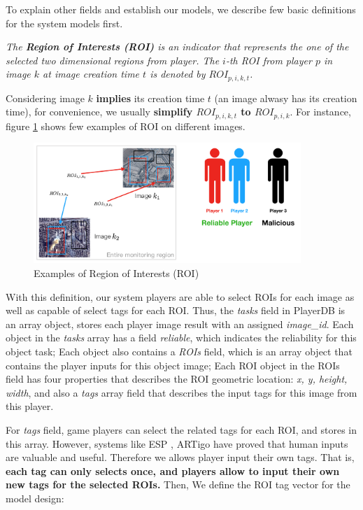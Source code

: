 To explain other fields and establish our models, we describe few basic definitions for the system models first.

\begin{definition}
\label{def:roi}
\emph{The \textbf{Region of Interests (ROI)} is an indicator that represents the one of the selected two dimensional regions from player. 
The $i$-th ROI from player $p$ in image $k$ at image creation time $t$ is denoted by $ROI_{p,i,k,t}$.}
\end{definition}

Considering image $k$ \textbf{implies} its creation time $t$ (an image alwasy has its creation time), for convenience, 
we usually \textbf{simplify $ROI_{p,i,k,t}$ to $ROI_{p,i,k}$}.
For instance, figure \ref{fig:roi} shows few examples of ROI on different images.

\begin{figure}[htp]
\centering
\includegraphics[width=0.9\textwidth]{figures/roi}
\caption{Examples of Region of Interests (ROI)}
\label{fig:roi}
\end{figure}

With this definition, our system players are able to select ROIs for each image as well as capable of select tags for each ROI.
Thus, the \emph{tasks} field in PlayerDB is an array object, stores each player image result with an assigned \emph{image\_id}.
Each object in the \emph{tasks} array has a field \emph{reliable}, which indicates the reliability for this object task;
Each object also contains a \emph{ROIs} field, which is an array object that contains the player inputs for this object image;
Each ROI object in the ROIs field has four properties that describes the ROI geometric location: \emph{x, y, height, width}, and 
also a \emph{tags} array field that describes the input tags for this image from this player.


For \emph{tags} field, game players can select the related tags for each ROI, and stores in this array. 
However, systems like ESP \cite{von2004labeling}, ARTigo \cite{wieser2013artigo} have proved that 
human inputs are valuable and useful. Therefore we allows player input their own tags. That is, 
\textbf{each tag can only selects once, and players allow to input their own new tags for the selected ROIs.} 
Then, We define the ROI tag vector for the model design:

